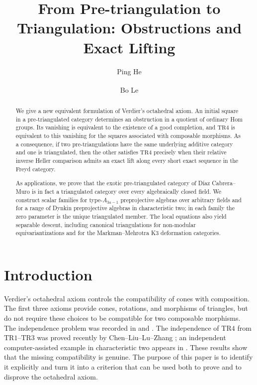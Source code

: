 \documentclass[a4paper,11pt,reqno]{amsart}
\title[From Pre-triangulation to Triangulation]
{From Pre-triangulation to Triangulation: Obstructions and Exact Lifting}
\author[Ping He]{Ping He}
\author[Bo Le]{Bo Le \textsuperscript{\correspondingmark}}
\date{}
\theoremstyle{definition}
\theoremstyle{plain}
\numberwithin{equation}{section}
\begin{document}
\begin{abstract}
We give a new equivalent formulation of Verdier's octahedral axiom.  An
initial square in a pre-triangulated category determines an obstruction in a
quotient of ordinary Hom groups.  Its vanishing is equivalent to the
existence of a good completion, and $\mathrm{TR4}$ is equivalent to this
vanishing for the squares associated with composable morphisms.  As a
consequence, if two
pre-triangulations have the same underlying additive category and one is
triangulated, then the other satisfies $\mathrm{TR4}$ precisely when their
relative inverse Heller comparison admits an exact lift along every short
exact sequence in the Freyd category.

As applications, we prove that the exotic pre-triangulated category of
D\'iaz Cabrera--Muro is in fact a triangulated category over every
algebraically closed field.
We construct scalar families for type-$A_{3a-1}$ preprojective algebras over arbitrary fields
and for a range of Dynkin preprojective algebras in characteristic two; in each family
the zero parameter is the unique triangulated member.  The local equations also yield separable
descent, including canonical triangulations for non-modular
equivariantizations and for the Markman--Mehrotra K3 deformation categories.
\end{abstract}

\maketitle
\section{Introduction}
\label{sec:introduction}

Verdier's octahedral axiom controls the compatibility of cones with
composition.  The first three axioms provide cones, rotations, and
morphisms of triangles, but do not require these choices to be compatible
for two composable morphisms.  The independence problem was recorded in
\cite[Conjecture~9.9]{Beligiannis2000} and
\cite[Remark~1.3.15]{Neeman2001}.  The independence of $\mathrm{TR4}$ from
$\mathrm{TR1}$--$\mathrm{TR3}$ was proved recently by
Chen--Liu--Lu--Zhang \cite{ChenLiuLuZhang2026}; an independent
computer-assisted example in characteristic two appears in
\cite{AnonymousD4}.  These results show that the missing compatibility is
genuine.  The purpose of this paper is to identify it explicitly and turn
it into a criterion that can be used both to prove and to disprove the
octahedral axiom.
\end{document}
